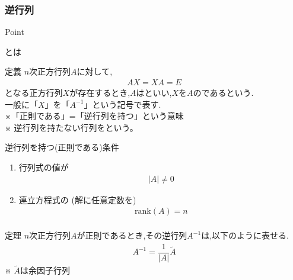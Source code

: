 \documentclass[a4paper]{jsarticle}
\begin{document}
\subsubsection{逆行列}
\begin{itembox}[l]{Point}
    \begin{center}
        とは
    \end{center}
\end{itembox}
\begin{itembox}[l]{定義}
    $n$次正方行列$A$に対して,
    \begin{eqnarray*}
        AX=XA=E
    \end{eqnarray*}
    となる正方行列$X$が存在するとき,$A$はといい,$X$を$A$のであるという.\\
    一般に「$X$」を「$A^{-1}$」という記号で表す.\\
    ※「正則である」=「逆行列を持つ」という意味\\
    ※ 逆行列を持たない行列をという。
\end{itembox}
\begin{itembox}[l]{逆行列を持つ(正則である)条件}
    \begin{enumerate}[(1)]
        \item 行列式の値が
              \begin{eqnarray*}
                  \left|A\right|\neq0
              \end{eqnarray*}
        \item 連立方程式の (解に任意定数を)
              \begin{eqnarray*}
                  \mathrm{rank}\left(A\right)=n\\
              \end{eqnarray*}
    \end{enumerate}
\end{itembox}
\begin{itembox}[l]{定理}
    $n$次正方行列$A$が正則であるとき,その逆行列$A^{-1}$は,以下のように表せる.
    \begin{eqnarray*}
        A^{-1}=\dfrac{1}{|A|}\tilde{A}
    \end{eqnarray*}
    ※ $\tilde{A}$は余因子行列
\end{itembox}
\\
\end{document}
